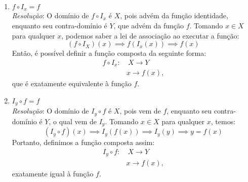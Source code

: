 \documentclass[13pt,letterpaper]{article}
\begin{document}
\begin{enumerate}
    \item $f \circ I_x = f$ \\
    \emph{Resolução}:
    O domínio de $f \circ I_x$ é $X$, pois advém da função identidade, 
    enquanto seu contra-domínio é $Y$, que advém da função $f$.
    Tomando $x \in X$ para qualquer $x$, podemos saber a lei de associação ao executar a função:
    \begin{displaymath}
        (f \circ I_X)(x) \implies f(I_x(x)) \implies f(x)
    \end{displaymath}
    Então, é possível definir a função composta da seguinte forma:
    \begin{align*}
        f \circ I_x: &\ X \rightarrow Y \\
        & x \rightarrow f(x),
    \end{align*}
    que é exatamente equivalente à função $f$.

    \item $I_y \circ f = f$ \\
    \emph{Resolução}:
    O domínio de $I_y \circ f$ é $X$, pois vem de $f$, enquanto seu contra-domínio é $Y$, o qual vem de $I_y$.
    Tomando $x \in X$ para qualquer $x$, temos:
    \begin{displaymath}
        (I_y \circ f)(x) \implies I_y(f(x)) \implies I_y(y) \implies y = f(x)
    \end{displaymath}
    Portanto, definimos a função composta assim:
    \begin{align*}
        I_y \circ f: &\ X \rightarrow Y \\
        & x \rightarrow f(x),
    \end{align*}
    exatamente igual à função $f$.
\end{enumerate}
\end{document}
